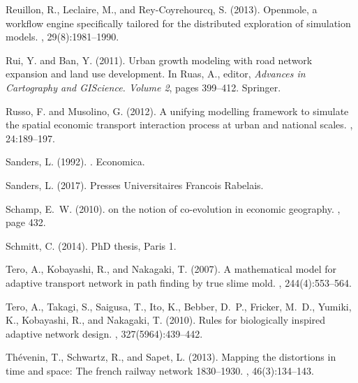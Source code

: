 \documentclass[11pt]{article}
\begin{document}
\begin{thebibliography}{}
Reuillon, R., Leclaire, M., and Rey-Coyrehourcq, S. (2013).
\newblock Openmole, a workflow engine specifically tailored for the distributed
  exploration of simulation models.
, 29(8):1981--1990.

Rui, Y. and Ban, Y. (2011).
\newblock Urban growth modeling with road network expansion and land use
  development.
\newblock In Ruas, A., editor, {\em Advances in Cartography and GIScience.
  Volume 2}, pages 399--412. Springer.

Russo, F. and Musolino, G. (2012).
\newblock A unifying modelling framework to simulate the spatial economic
  transport interaction process at urban and national scales.
, 24:189--197.

Sanders, L. (1992).
.
\newblock Economica.

Sanders, L. (2017).
\newblock Presses Universitaires Francois Rabelais.

Schamp, E.~W. (2010).
 on the notion of co-evolution in economic geography.
, page 432.

Schmitt, C. (2014).
\newblock PhD thesis, Paris 1.

Tero, A., Kobayashi, R., and Nakagaki, T. (2007).
\newblock A mathematical model for adaptive transport network in path finding
  by true slime mold.
, 244(4):553--564.

Tero, A., Takagi, S., Saigusa, T., Ito, K., Bebber, D.~P., Fricker, M.~D.,
  Yumiki, K., Kobayashi, R., and Nakagaki, T. (2010).
\newblock Rules for biologically inspired adaptive network design.
, 327(5964):439--442.

Th{\'e}venin, T., Schwartz, R., and Sapet, L. (2013).
\newblock Mapping the distortions in time and space: The french railway network
  1830--1930.
, 46(3):134--143.


\end{thebibliography}
\end{document}
